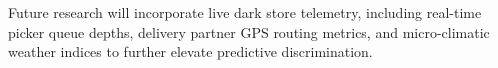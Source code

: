 \documentclass[11pt,a4paper]{article}
\begin{document}
Future research will incorporate live dark store telemetry, including real-time picker queue depths, delivery partner GPS routing metrics, and micro-climatic weather indices to further elevate predictive discrimination.



\end{document}
